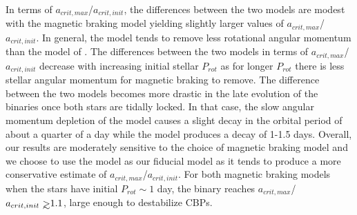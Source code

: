 In terms of $a_{crit,max}$/$a_{crit,init}$, the differences between the two models are modest with the \citet{Repetto2014} magnetic braking model yielding slightly larger values of $a_{crit,max}$/$a_{crit,init}$.  In general, the \citet{Repetto2014} model tends to remove less rotational angular momentum than the model of \citet{Reiners2012}.  The differences between the two models in terms of $a_{crit,max}$/$a_{crit,init}$ decrease with increasing initial stellar $P_{rot}$ as for longer $P_{rot}$ there is less stellar angular momentum for magnetic braking to remove.  The difference between the two models becomes more drastic in the late evolution of the binaries once both stars are tidally locked.  In that case, the slow angular momentum depletion of the \citet{Repetto2014} model causes a slight decay in the orbital period of about a quarter of a day while the \citet{Reiners2012} model produces a decay of 1-1.5 days.  Overall, our results are moderately sensitive to the choice of magnetic braking model and we choose to use the \citet{Reiners2012} model as our fiducial model as it tends to produce a more conservative estimate of $a_{crit,max}$/$a_{crit,init}$.  For both magnetic braking models when the stars have initial $P_{rot} \sim 1$ day, the binary reaches $a_{crit,max}$/$a_{crit,init} \gsim 1.1$, large enough to destabilize CBPs.  

